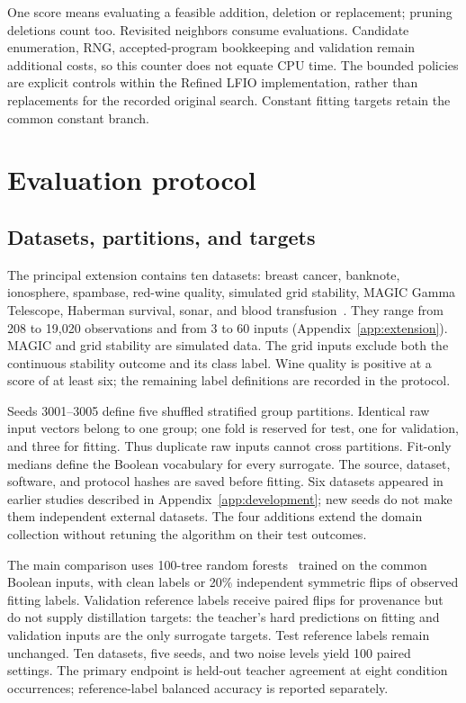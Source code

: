 \documentclass[a4paper,fleqn,review]{cas-sc}
\begin{document}
One score means evaluating a feasible addition, deletion or replacement; pruning deletions count too. Revisited neighbors consume evaluations. Candidate enumeration, RNG, accepted-program bookkeeping and validation remain additional costs, so this counter does not equate CPU time. The bounded policies are explicit controls within the Refined LFIO implementation, rather than replacements for the recorded original search. Constant fitting targets retain the common constant branch.

\section{Evaluation protocol}
\subsection{Datasets, partitions, and targets}
The principal extension contains ten datasets: breast cancer, banknote, ionosphere, spambase, red-wine quality, simulated grid stability, MAGIC Gamma Telescope, Haberman survival, sonar, and blood transfusion~\citep{uci,wine,grid,magic,haberman,sonar,transfusion}. They range from 208 to 19,020 observations and from 3 to 60 inputs (Appendix~\ref{app:extension}). MAGIC and grid stability are simulated data. The grid inputs exclude both the continuous stability outcome and its class label. Wine quality is positive at a score of at least six; the remaining label definitions are recorded in the protocol.

Seeds 3001--3005 define five shuffled stratified group partitions. Identical raw input vectors belong to one group; one fold is reserved for test, one for validation, and three for fitting. Thus duplicate raw inputs cannot cross partitions. Fit-only medians define the Boolean vocabulary for every surrogate. The source, dataset, software, and protocol hashes are saved before fitting. Six datasets appeared in earlier studies described in Appendix~\ref{app:development}; new seeds do not make them independent external datasets. The four additions extend the domain collection without retuning the algorithm on their test outcomes.

The main comparison uses 100-tree random forests~\citep{breiman2001} trained on the common Boolean inputs, with clean labels or 20\% independent symmetric flips of observed fitting labels. Validation reference labels receive paired flips for provenance but do not supply distillation targets: the teacher's hard predictions on fitting and validation inputs are the only surrogate targets. Test reference labels remain unchanged. Ten datasets, five seeds, and two noise levels yield 100 paired settings. The primary endpoint is held-out teacher agreement at eight condition occurrences; reference-label balanced accuracy is reported separately.
\end{document}
